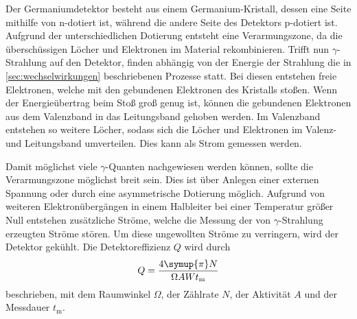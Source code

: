 Der Germaniumdetektor besteht aus einem Germanium-Kristall,
dessen eine Seite mithilfe von n-dotiert ist,
während die andere Seite des Detektors p-dotiert ist.
Aufgrund der unterschiedlichen Dotierung entsteht eine Verarmungszone,
da die überschüssigen Löcher und Elektronen im Material rekombinieren.
Trifft nun $\gamma$-Strahlung auf den Detektor,
finden abhängig von der Energie der Strahlung die in \autoref{sec:wechselwirkungen} beschriebenen Prozesse statt.
Bei diesen entstehen freie Elektronen,
welche mit den gebundenen Elektronen des Kristalls stoßen.
Wenn der Energieübertrag beim Stoß groß genug ist,
können die gebundenen Elektronen aus dem Valenzband in das Leitungsband gehoben werden.
Im Valenzband entstehen so weitere Löcher,
sodass sich die Löcher und Elektronen im Valenz- und Leitungsband umverteilen.
Dies kann als Strom gemessen werden.

Damit möglichst viele $\gamma$-Quanten nachgewiesen werden können,
sollte die Verarmungszone möglichst breit sein.
Dies ist über Anlegen einer externen Spannung
oder durch eine asymmetrische Dotierung möglich.
Aufgrund von weiteren Elektronübergängen in einem Halbleiter bei einer Temperatur größer Null entstehen zusätzliche Ströme,
welche die Messung der von $\gamma$-Strahlung erzeugten Ströme stören.
Um diese ungewollten Ströme zu verringern,
wird der Detektor gekühlt.
Die Detektoreffizienz $Q$ wird durch
\begin{equation}
    Q = \frac{4 \symup{\pi} N}{\Omega A W t_\text{m}}
\end{equation}
beschrieben,
mit dem Raumwinkel $\Omega$,
der Zählrate $N$,
der Aktivität $A$ und der Messdauer $t_\text{m}$.
